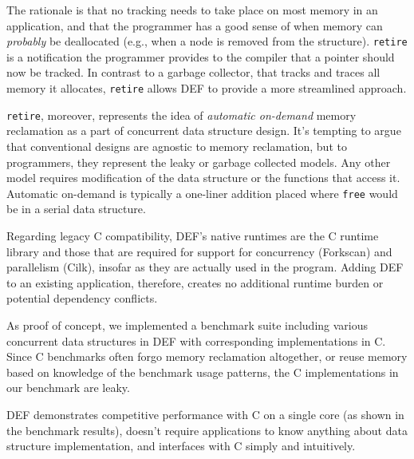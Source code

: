 The rationale is that no tracking needs to take place on most memory in an application, and that the programmer has a good sense of when memory can \textit{probably} be deallocated (e.g., when a node is removed from the structure).  \texttt{retire} is a notification the programmer provides to the compiler that a pointer should now be tracked.  In contrast to a garbage collector, that tracks and traces all memory it allocates, \texttt{retire} allows DEF to provide a more streamlined approach.

\texttt{retire}, moreover, represents the idea of \textit{automatic on-demand} memory reclamation as a part of concurrent data structure design.  It's tempting to argue that conventional designs are agnostic to memory reclamation, but to programmers, they represent the leaky or garbage collected models.  Any other model requires modification of the data structure or the functions that access it.  Automatic on-demand is typically a one-liner addition placed where \texttt{free} would be in a serial data structure.

Regarding legacy C compatibility, DEF's native runtimes are the C runtime library and those that are required for support for concurrency (Forkscan\cite{Forkscan}) and parallelism (Cilk\cite{BlumofeCilk}), insofar as they are actually used in the program.  Adding DEF to an existing application, therefore, creates no additional runtime burden or potential dependency conflicts.

As proof of concept, we implemented a benchmark suite including various concurrent data structures in DEF with corresponding implementations in C.  Since C benchmarks often forgo memory reclamation altogether, or reuse memory based on knowledge of the benchmark usage patterns,\cite{Synchrobench, Scal} the C implementations in our benchmark are leaky.

DEF demonstrates competitive performance with C on a single core (as shown in the benchmark results), doesn't require applications to know anything about data structure implementation, and interfaces with C simply and intuitively.
